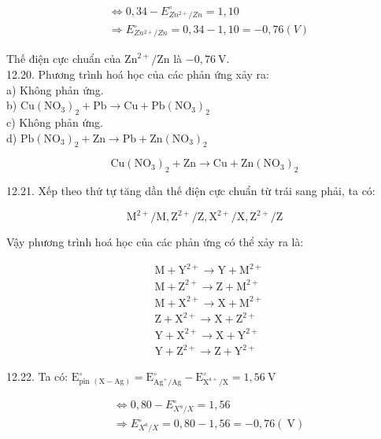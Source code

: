 \documentclass[10pt]{article}
\begin{document}
$$
\begin{aligned}
& \Leftrightarrow 0,34-E_{Z n^{2+} / Z n}^{\circ}=1,10 \\
& \Rightarrow E_{Z n^{2+} / Z n}^{\circ}=0,34-1,10=-0,76(V)
\end{aligned}
$$

Thế điện cực chuẩn của $\mathrm{Zn}^{2+} / \mathrm{Zn}$ là $-0,76 \mathrm{~V}$.\\
12.20. Phương trình hoá học của các phản ứng xảy ra:\\
a) Không phản ứng.\\
b) $\mathrm{Cu}\left(\mathrm{NO}_{3}\right)_{2}+\mathrm{Pb} \rightarrow \mathrm{Cu}+\mathrm{Pb}\left(\mathrm{NO}_{3}\right)_{2}$\\
c) Không phản ứng.\\
d) $\mathrm{Pb}\left(\mathrm{NO}_{3}\right)_{2}+\mathrm{Zn} \rightarrow \mathrm{Pb}+\mathrm{Zn}\left(\mathrm{NO}_{3}\right)_{2}$

$$
\mathrm{Cu}\left(\mathrm{NO}_{3}\right)_{2}+\mathrm{Zn} \rightarrow \mathrm{Cu}+\mathrm{Zn}\left(\mathrm{NO}_{3}\right)_{2}
$$

12.21. Xếp theo thứ tự tăng dần thế điện cực chuẩn từ trái sang phải, ta có:

$$
\mathrm{M}^{2+} / \mathrm{M}, \mathrm{Z}^{2+} / \mathrm{Z}, \mathrm{X}^{2+} / \mathrm{X}, \mathrm{Z}^{2+} / \mathrm{Z}
$$

Vậy phương trình hoá học của các phản ứng có thể xảy ra là:

$$
\begin{aligned}
& \mathrm{M}+\mathrm{Y}^{2+} \rightarrow \mathrm{Y}+\mathrm{M}^{2+} \\
& \mathrm{M}+\mathrm{Z}^{2+} \rightarrow \mathrm{Z}+\mathrm{M}^{2+} \\
& \mathrm{M}+\mathrm{X}^{2+} \rightarrow \mathrm{X}+\mathrm{M}^{2+} \\
& \mathrm{Z}+\mathrm{X}^{2+} \rightarrow \mathrm{X}+\mathrm{Z}^{2+} \\
& \mathrm{Y}+\mathrm{X}^{2+} \rightarrow \mathrm{X}+\mathrm{Y}^{2+} \\
& \mathrm{Y}+\mathrm{Z}^{2+} \rightarrow \mathrm{Z}+\mathrm{Y}^{2+}
\end{aligned}
$$

12.22. Ta có: $\mathrm{E}_{\text {pin }(\mathrm{X}-\mathrm{Ag})}^{\circ}=\mathrm{E}_{\mathrm{Ag}^{+} / \mathrm{Ag}}^{\circ}-\mathrm{E}_{\mathrm{X}^{\mathrm{a}+} / \mathrm{X}}^{\circ}=1,56 \mathrm{~V}$

$$
\begin{aligned}
& \Leftrightarrow 0,80-E_{X^{a} / X}^{\circ}=1,56 \\
& \Rightarrow E_{X^{a} / X}^{\circ}=0,80-1,56=-0,76(\mathrm{~V})
\end{aligned}
$$
\end{document}
